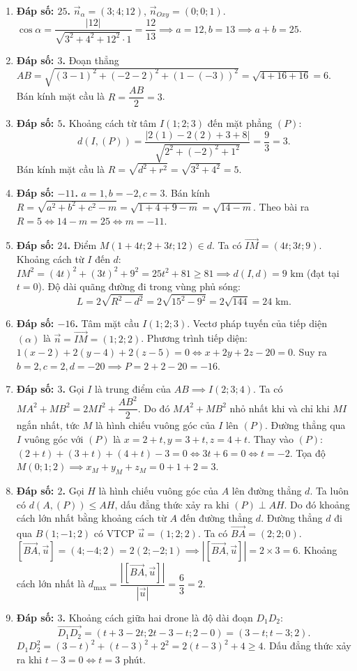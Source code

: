\documentclass[12pt,a4paper]{article}
\begin{document}
\begin{enumerate}
\item \textbf{Đáp số: $25$.}  
$\vec{n}_\alpha = (3; 4; 12)$, $\vec{n}_{Oxy} = (0; 0; 1)$.  
$\cos\alpha = \dfrac{|12|}{\sqrt{3^2 + 4^2 + 12^2}\cdot 1} = \dfrac{12}{13} \implies a = 12, b = 13 \implies a + b = 25$.

\item \textbf{Đáp số: $3$.}  
Đoạn thẳng $AB = \sqrt{(3-1)^2 + (-2-2)^2 + (1 - (-3))^2} = \sqrt{4 + 16 + 16} = 6$.  
Bán kính mặt cầu là $R = \dfrac{AB}{2} = 3$.

\item \textbf{Đáp số: $5$.}  
Khoảng cách từ tâm $I(1; 2; 3)$ đến mặt phẳng $(P)$:
\[
d(I, (P)) = \dfrac{|2(1) - 2(2) + 3 + 8|}{\sqrt{2^2 + (-2)^2 + 1^2}} = \dfrac{9}{3} = 3.
\]
Bán kính mặt cầu là $R = \sqrt{d^2 + r^2} = \sqrt{3^2 + 4^2} = 5$.

\item \textbf{Đáp số: $-11$.}  
$a = 1, b = -2, c = 3$. Bán kính $R = \sqrt{a^2 + b^2 + c^2 - m} = \sqrt{1 + 4 + 9 - m} = \sqrt{14 - m}$.  
Theo bài ra $R = 5 \iff 14 - m = 25 \iff m = -11$.

\item \textbf{Đáp số: $24$.}  
Điểm $M(1 + 4t; 2 + 3t; 12) \in d$. Ta có $\vec{IM} = (4t; 3t; 9)$.  
Khoảng cách từ $I$ đến $d$: $IM^2 = (4t)^2 + (3t)^2 + 9^2 = 25t^2 + 81 \ge 81 \implies d(I, d) = 9\text{ km}$ (đạt tại $t = 0$).  
Độ dài quãng đường đi trong vùng phủ sóng:
\[
L = 2\sqrt{R^2 - d^2} = 2\sqrt{15^2 - 9^2} = 2\sqrt{144} = 24\text{ km}.
\]

\item \textbf{Đáp số: $-16$.}  
Tâm mặt cầu $I(1; 2; 3)$. Vectơ pháp tuyến của tiếp diện $(\alpha)$ là $\vec{n} = \vec{IM} = (1; 2; 2)$.  
Phương trình tiếp diện: $1(x - 2) + 2(y - 4) + 2(z - 5) = 0 \iff x + 2y + 2z - 20 = 0$.  
Suy ra $b = 2, c = 2, d = -20 \implies P = 2 + 2 - 20 = -16$.

\item \textbf{Đáp số: $3$.}  
Gọi $I$ là trung điểm của $AB \implies I(2; 3; 4)$.  
Ta có $MA^2 + MB^2 = 2MI^2 + \dfrac{AB^2}{2}$. Do đó $MA^2 + MB^2$ nhỏ nhất khi và chỉ khi $MI$ ngắn nhất, tức $M$ là hình chiếu vuông góc của $I$ lên $(P)$.  
Đường thẳng qua $I$ vuông góc với $(P)$ là $x = 2 + t, y = 3 + t, z = 4 + t$.  
Thay vào $(P)$: $(2 + t) + (3 + t) + (4 + t) - 3 = 0 \iff 3t + 6 = 0 \iff t = -2$.  
Tọa độ $M(0; 1; 2) \implies x_M + y_M + z_M = 0 + 1 + 2 = 3$.

\item \textbf{Đáp số: $2$.}  
Gọi $H$ là hình chiếu vuông góc của $A$ lên đường thẳng $d$. Ta luôn có $d(A, (P)) \le AH$, dấu đẳng thức xảy ra khi $(P) \perp AH$.  
Do đó khoảng cách lớn nhất bằng khoảng cách từ $A$ đến đường thẳng $d$.  
Đường thẳng $d$ đi qua $B(1; -1; 2)$ có VTCP $\vec{u} = (1; 2; 2)$. Ta có $\vec{BA} = (2; 2; 0)$.  
$[\vec{BA}, \vec{u}] = (4; -4; 2) = 2(2; -2; 1) \implies |[\vec{BA}, \vec{u}]| = 2 \times 3 = 6$.  
Khoảng cách lớn nhất là $d_{\max} = \dfrac{|[\vec{BA}, \vec{u}]|}{|\vec{u}|} = \dfrac{6}{3} = 2$.

\item \textbf{Đáp số: $3$.}  
Khoảng cách giữa hai drone là độ dài đoạn $D_1D_2$:
\[
\vec{D_1D_2} = (t + 3 - 2t; 2t - 3 - t; 2 - 0) = (3 - t; t - 3; 2).
\]
$D_1D_2^2 = (3 - t)^2 + (t - 3)^2 + 2^2 = 2(t - 3)^2 + 4 \ge 4$.  
Dấu đẳng thức xảy ra khi $t - 3 = 0 \iff t = 3$ phút.
\end{enumerate}
\end{document}
